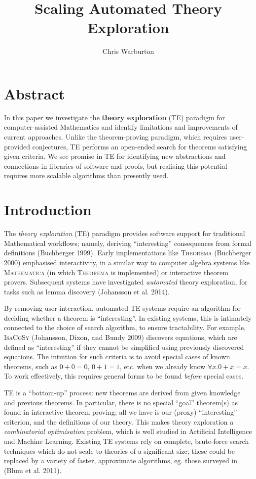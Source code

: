 \documentclass[]{article}
\title{Scaling Automated Theory Exploration}
\author{Chris Warburton}
\date{}
\begin{document}
\maketitle

\section{Abstract}\label{abstract}

In this paper we investigate the \textbf{theory exploration} (TE)
paradigm for computer-assisted Mathematics and identify limitations and
improvements of current approaches. Unlike the theorem-proving paradigm,
which requires user-provided conjectures, TE performs an open-ended
search for theorems satisfying given criteria. We see promise in TE for
identifying new abstractions and connections in libraries of software
and proofs, but realising this potential requires more scalable
algorithms than presently used.

\section{Introduction}\label{introduction}

The \emph{theory exploration} (TE) paradigm provides software support
for traditional Mathematical workflows; namely, deriving ``interesting''
consequences from formal definitions (Buchberger 1999). Early
implementations like \textsc{Theorema} (Buchberger 2000) emphasised
interactivity, in a similar way to computer algebra systems like
\textsc{Mathematica} (in which \textsc{Theorema} is implemented) or
interactive theorem provers. Subsequent systems have investigated
\emph{automated} theory exploration, for tasks such as lemma discovery
(Johansson et al. 2014).

By removing user interaction, automated TE systems require an algorithm
for deciding whether a theorem is ``interesting''. In existing systems,
this is intimately connected to the choice of search algorithm, to
ensure tractability. For example, \textsc{IsaCoSy} (Johansson, Dixon,
and Bundy 2009) discovers equations, which are defined as
``interesting'' if they cannot be simplified using previously discovered
equations. The intuition for such criteria is to avoid special cases of
known theorems, such as \(0 + 0 = 0\), \(0 + 1 = 1\), etc. when we
already know \(\forall x. 0 + x = x\). To work effectively, this
requires general forms to be found \emph{before} special cases.

TE is a ``bottom-up'' process: new theorems are derived from given
knowledge and previous theorems. In particular, there is no special
``goal'' theorem(s) as found in interactive theorem proving; all we have
is our (proxy) ``interesting'' criterion, and the definitions of our
theory. This makes theory exploration a \emph{combinatorial
optimisation} problem, which is well studied in Artificial Intelligence
and Machine Learning. Existing TE systems rely on complete, brute-force
search techniques which do not scale to theories of a significant size;
these could be replaced by a variety of faster, approximate algorithms,
eg. those surveyed in (Blum et al. 2011).
\end{document}
